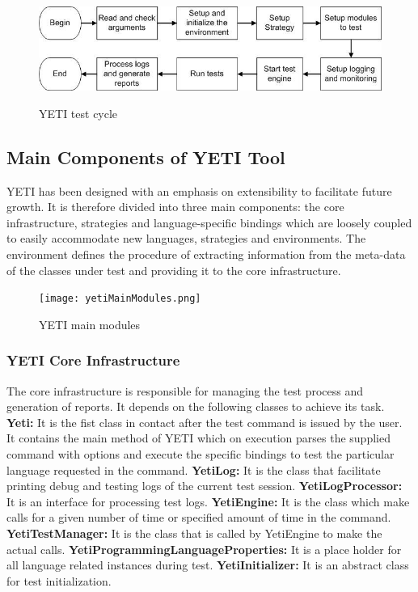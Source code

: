 \begin{figure}[h]
	\centering
	\includegraphics[width=14.5cm, height=3.5cm]{chapter3/yetiOverview.png}
	\caption{YETI test cycle}
	\label{fig:yetiOverview}
\end{figure}


\subsection{Main Components of YETI Tool}
YETI has been designed with an emphasis on extensibility to facilitate future growth. It is therefore divided into three main components: the core infrastructure, strategies and language-specific bindings which are loosely coupled to easily accommodate new languages, strategies and environments. The environment defines the procedure of extracting information from the meta-data of the classes under test and providing it to the core infrastructure. 

\begin{figure}[h]
	\centering
	\texttt{[image: yetiMainModules.png]}
	\caption{YETI main modules}
	\label{fig:yetiMainModules}
\end{figure}

\subsubsection{YETI Core Infrastructure}
The core infrastructure is responsible for managing the test process and generation of reports. It depends on the following classes to achieve its task.
{\textbf{Yeti:}} It is the fist class in contact after the test command is issued by the user. It contains the main method of YETI which on execution parses the supplied command with options and execute the specific bindings to test the particular language requested in the command.
{\textbf{YetiLog:}} It is the class that facilitate printing debug and testing logs of the current test session. 
{\textbf{YetiLogProcessor:}} It is an interface for processing test logs.
{\textbf{YetiEngine:}} It is the class which make calls for a given number of time or specified amount of time in the command.
{\textbf{YetiTestManager:}} It is the class that is called by YetiEngine to make the actual calls.
{\textbf{YetiProgrammingLanguageProperties:}} It is a place holder for all language related instances during test.
{\textbf{YetiInitializer:}} It is an abstract class for test initialization.

